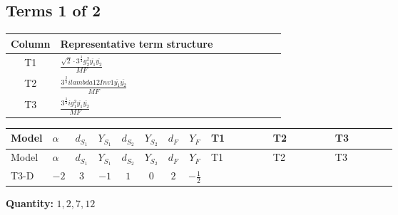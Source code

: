 \documentclass[8pt]{article}
\begin{document}
\begin{landscape}
\subsection*{Terms 1 of 2}
\begin{center}
\begin{tabular}{@{}c >{\raggedright\arraybackslash}p{0.82\linewidth}@{}}
\toprule
Column & Representative term structure \\
\midrule
T1 & \(\displaystyle \frac{\sqrt{2} \cdot 3^{\frac{3}{4}} g_{2}^{2} \overline{y_{1}} \overline{y_{2}}}{MF}\) \\
\midrule
T2 & \(\displaystyle \frac{3^{\frac{3}{4}} i lambda12Inv1 \overline{y_{1}} \overline{y_{2}}}{MF}\) \\
\midrule
T3 & \(\displaystyle \frac{3^{\frac{3}{4}} i g_{1}^{2} \overline{y_{1}} \overline{y_{2}}}{MF}\) \\
\midrule
\bottomrule
\end{tabular}
\end{center}
\smallskip
\tiny
\begin{longtable}{@{}llcccccc >{\raggedright\arraybackslash}p{0.21\linewidth} >{\raggedright\arraybackslash}p{0.21\linewidth} >{\raggedright\arraybackslash}p{0.21\linewidth}@{}}
\toprule
Model & $\alpha$ & $d_{S_1}$ & $Y_{S_1}$ & $d_{S_2}$ & $Y_{S_2}$ & $d_F$ & $Y_F$ & T1 & T2 & T3 \\
\midrule
\endfirsthead
\toprule
Model & $\alpha$ & $d_{S_1}$ & $Y_{S_1}$ & $d_{S_2}$ & $Y_{S_2}$ & $d_F$ & $Y_F$ & T1 & T2 & T3 \\
\midrule
\endhead
T3-D & $-2$ & $3$ & $-1$ & $1$ & $0$ & $2$ & $-\frac{1}{2}$ & \scriptsize\adjustbox{max width=\linewidth}{$\begin{gathered} - \frac{\sqrt{2} \cdot 3^{\frac{3}{4}} g_{2}^{2} \overline{y_{1}} \overline{y_{2}}}{6 MF}\end{gathered}$} & \scriptsize\adjustbox{max width=\linewidth}{$\begin{gathered} \frac{3^{\frac{3}{4}} i lambda12Inv1 \overline{y_{1}} \overline{y_{2}}}{6 MF}\end{gathered}$} & \scriptsize\adjustbox{max width=\linewidth}{$\begin{gathered} \frac{3^{\frac{3}{4}} i g_{1}^{2} \overline{y_{1}} \overline{y_{2}}}{8 MF}\end{gathered}$} \\
\midrule
\bottomrule
\end{longtable}
\clearpage
\noindent\textbf{Quantity: }$\mathrm{1,2,7,12}$\par\smallskip

\end{landscape}
\end{document}
